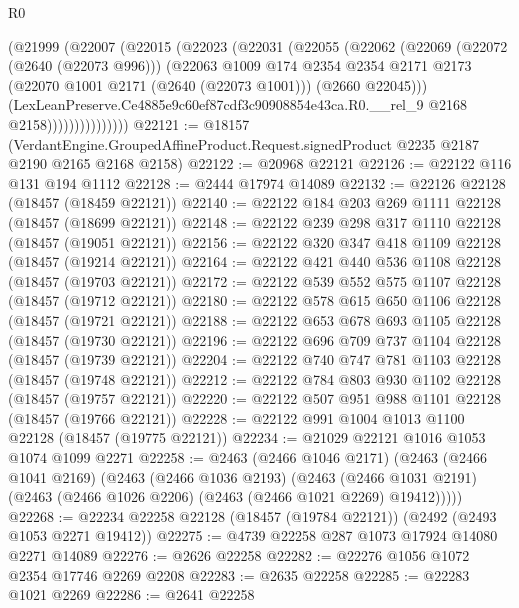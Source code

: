 \begin{lexlean}{R0}
\begin{coremodule}
                  (@21999
                    (@22007
                      (@22015
                        (@22023
                          (@22031
                            (@22055
                              (@22062
                                (@22069
                                  (@22072 (@2640 (@22073 @996)))
                                  (@22063
                                    @1009
                                    @174
                                    @2354
                                    @2354
                                    @2171
                                    @2173
                                    (@22070 @1001 @2171 (@2640 (@22073 @1001)))
                                    (@2660 @22045)))
                                (LexLeanPreserve.Ce4885e9c60ef87cdf3c90908854e43ca.R0.__rel_9
                                  @2168
                                  @2158)))))))))))))))
@22121 := @18157
    (VerdantEngine.GroupedAffineProduct.Request.signedProduct @2235 @2187 @2190 @2165 @2168 @2158)
@22122 := @20968 @22121
@22126 := @22122 @116 @131 @194 @1112
@22128 := @2444 @17974 @14089
@22132 := @22126 @22128 (@18457 (@18459 @22121))
@22140 := @22122 @184 @203 @269 @1111 @22128 (@18457 (@18699 @22121))
@22148 := @22122 @239 @298 @317 @1110 @22128 (@18457 (@19051 @22121))
@22156 := @22122 @320 @347 @418 @1109 @22128 (@18457 (@19214 @22121))
@22164 := @22122 @421 @440 @536 @1108 @22128 (@18457 (@19703 @22121))
@22172 := @22122 @539 @552 @575 @1107 @22128 (@18457 (@19712 @22121))
@22180 := @22122 @578 @615 @650 @1106 @22128 (@18457 (@19721 @22121))
@22188 := @22122 @653 @678 @693 @1105 @22128 (@18457 (@19730 @22121))
@22196 := @22122 @696 @709 @737 @1104 @22128 (@18457 (@19739 @22121))
@22204 := @22122 @740 @747 @781 @1103 @22128 (@18457 (@19748 @22121))
@22212 := @22122 @784 @803 @930 @1102 @22128 (@18457 (@19757 @22121))
@22220 := @22122 @507 @951 @988 @1101 @22128 (@18457 (@19766 @22121))
@22228 := @22122 @991 @1004 @1013 @1100 @22128 (@18457 (@19775 @22121))
@22234 := @21029 @22121 @1016 @1053 @1074 @1099 @2271
@22258 := @2463
    (@2466 @1046 @2171)
    (@2463
      (@2466 @1041 @2169)
      (@2463
        (@2466 @1036 @2193)
        (@2463 (@2466 @1031 @2191) (@2463 (@2466 @1026 @2206) (@2463 (@2466 @1021 @2269) @19412)))))
@22268 := @22234 @22258 @22128 (@18457 (@19784 @22121)) (@2492 (@2493 @1053 @2271 @19412))
@22275 := @4739 @22258 @287 @1073 @17924 @14080 @2271 @14089
@22276 := @2626 @22258
@22282 := @22276 @1056 @1072 @2354 @17746 @2269 @2208
@22283 := @2635 @22258
@22285 := @22283 @1021 @2269
@22286 := @2641 @22258

\end{coremodule}
\end{lexlean}
